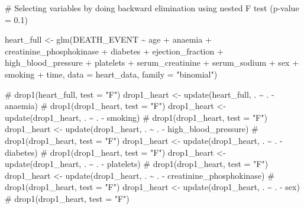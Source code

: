 \documentclass[
  letterpaper,
  DIV=11,
  numbers=noendperiod]{scrartcl}
\newenvironment{Shaded}{\begin{snugshade}}{\end{snugshade}}
\newcommand{\AttributeTok}[1]{\textcolor[rgb]{0.40,0.45,0.13}{#1}}
\newcommand{\CommentTok}[1]{\textcolor[rgb]{0.37,0.37,0.37}{#1}}
\newcommand{\FunctionTok}[1]{\textcolor[rgb]{0.28,0.35,0.67}{#1}}
\newcommand{\NormalTok}[1]{\textcolor[rgb]{0.00,0.23,0.31}{#1}}
\newcommand{\OtherTok}[1]{\textcolor[rgb]{0.00,0.23,0.31}{#1}}
\newcommand{\SpecialCharTok}[1]{\textcolor[rgb]{0.37,0.37,0.37}{#1}}
\newcommand{\StringTok}[1]{\textcolor[rgb]{0.13,0.47,0.30}{#1}}
\begin{document}
\begin{Shaded}
\begin{Highlighting}[]
\CommentTok{\# Selecting variables by doing backward elimination using nested F test (p{-}value = 0.1)}

\NormalTok{heart\_full }\OtherTok{\textless{}{-}} \FunctionTok{glm}\NormalTok{(DEATH\_EVENT }\SpecialCharTok{\textasciitilde{}}\NormalTok{ age }\SpecialCharTok{+}\NormalTok{ anaemia }\SpecialCharTok{+}\NormalTok{ creatinine\_phosphokinase }\SpecialCharTok{+}\NormalTok{ diabetes }\SpecialCharTok{+}\NormalTok{ ejection\_fraction }\SpecialCharTok{+}\NormalTok{ high\_blood\_pressure }\SpecialCharTok{+}\NormalTok{ platelets }\SpecialCharTok{+}\NormalTok{ serum\_creatinine }\SpecialCharTok{+}\NormalTok{ serum\_sodium }\SpecialCharTok{+}\NormalTok{ sex }\SpecialCharTok{+}\NormalTok{ smoking }\SpecialCharTok{+}\NormalTok{ time, }\AttributeTok{data =}\NormalTok{ heart\_data, }\AttributeTok{family =} \StringTok{"binomial"}\NormalTok{)}

\CommentTok{\# drop1(heart\_full, test = "F")}
\NormalTok{drop1\_heart }\OtherTok{\textless{}{-}} \FunctionTok{update}\NormalTok{(heart\_full, . }\SpecialCharTok{\textasciitilde{}}\NormalTok{ . }\SpecialCharTok{{-}}\NormalTok{ anaemia)}
\CommentTok{\# drop1(drop1\_heart, test = "F")}
\NormalTok{drop1\_heart }\OtherTok{\textless{}{-}} \FunctionTok{update}\NormalTok{(drop1\_heart, . }\SpecialCharTok{\textasciitilde{}}\NormalTok{ . }\SpecialCharTok{{-}}\NormalTok{ smoking)}
\CommentTok{\# drop1(drop1\_heart, test = "F")}
\NormalTok{drop1\_heart }\OtherTok{\textless{}{-}} \FunctionTok{update}\NormalTok{(drop1\_heart, . }\SpecialCharTok{\textasciitilde{}}\NormalTok{ . }\SpecialCharTok{{-}}\NormalTok{ high\_blood\_pressure)}
\CommentTok{\# drop1(drop1\_heart, test = "F")}
\NormalTok{drop1\_heart }\OtherTok{\textless{}{-}} \FunctionTok{update}\NormalTok{(drop1\_heart, . }\SpecialCharTok{\textasciitilde{}}\NormalTok{ . }\SpecialCharTok{{-}}\NormalTok{ diabetes)}
\CommentTok{\#  drop1(drop1\_heart, test = "F")}
\NormalTok{drop1\_heart }\OtherTok{\textless{}{-}} \FunctionTok{update}\NormalTok{(drop1\_heart, . }\SpecialCharTok{\textasciitilde{}}\NormalTok{ . }\SpecialCharTok{{-}}\NormalTok{ platelets)}
\CommentTok{\#  drop1(drop1\_heart, test = "F")}
\NormalTok{drop1\_heart }\OtherTok{\textless{}{-}} \FunctionTok{update}\NormalTok{(drop1\_heart, . }\SpecialCharTok{\textasciitilde{}}\NormalTok{ . }\SpecialCharTok{{-}}\NormalTok{ creatinine\_phosphokinase)}
\CommentTok{\# drop1(drop1\_heart, test = "F")}
\NormalTok{drop1\_heart }\OtherTok{\textless{}{-}} \FunctionTok{update}\NormalTok{(drop1\_heart, . }\SpecialCharTok{\textasciitilde{}}\NormalTok{ . }\SpecialCharTok{{-}}\NormalTok{ sex)}
\CommentTok{\# drop1(drop1\_heart, test = "F")}


\end{Highlighting}
\end{Shaded}
\end{document}
